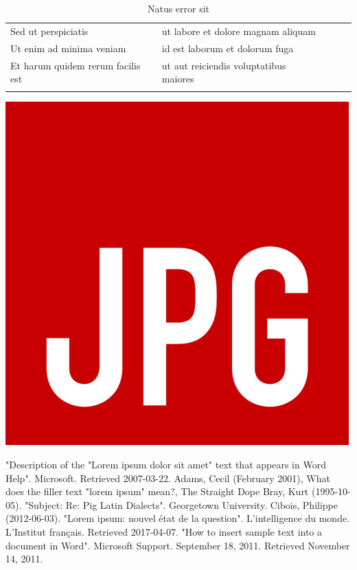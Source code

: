 \documentclass{article}
\begin{document}
	\begin{table}
		\caption{Natus error sit}
		\begin{tabular}{lllll}
			\cline{1-2}
			\multicolumn{1}{|l|}{Sed ut perspiciatis} & \multicolumn{1}{l|}{ut labore et dolore magnam aliquam } &  &  &  \\ \cline{1-2}
			\multicolumn{1}{|l|}{Ut enim ad minima veniam} & \multicolumn{1}{l|}{id est laborum et dolorum fuga} &  &  &  \\ \cline{1-2}
			\multicolumn{1}{|l|}{Et harum quidem rerum facilis est} & \multicolumn{1}{l|}{ut aut reiciendis voluptatibus maiores} &  &  &  \\ \cline{1-2}
			&                       &  &  & 
		\end{tabular}
	\end{table}
	\includegraphics[]{aaa.jpg}
	\begin{thebibliography}{5}
		 "Description of the "Lorem ipsum dolor sit amet" text that appears in Word Help". Microsoft. Retrieved 2007-03-22.
		 Adams, Cecil (February 2001), What does the filler text "lorem ipsum" mean?, The Straight Dope
		Bray, Kurt (1995-10-05). "Subject: Re: Pig Latin Dialects". Georgetown University.
		Cibois, Philippe (2012-06-03). "Lorem ipsum: nouvel état de la question". L'intelligence du monde. L'Institut français. Retrieved 2017-04-07.
		 "How to insert sample text into a document in Word". Microsoft Support. September 18, 2011. Retrieved November 14, 2011.
	\end{thebibliography}
\end{document}
